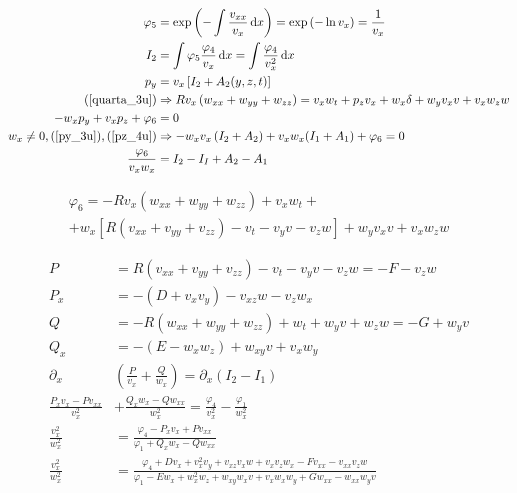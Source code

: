 \documentclass[12pt,a4paper]{article}
\begin{document}
	\begin{align}
	  \varphi_5 &= \exp \left(- \int{ \frac{v_{xx}}{v_x} \,\mathrm{d} x} \right) = \exp \left(- \ln v_x \right) = \frac{1}{v_x} \\
	  I_2 &= \int{ \varphi_5 \frac{\varphi_4 }{v_x} \,\mathrm{d} x} = \int{ \frac{\varphi_4}{v_x^2} \,\mathrm{d} x} \\
	  p_y &= v_x \left[ I_2 + A_2(y,z,t) \right] \label{py_3u} \\
    (\ref{quarta_3u}) &\Rightarrow R v_x \left(w_{xx} + w_{yy} + w_{zz} \right) = v_x w_t + p_z v_x + w_x \delta + w_y v_x v + v_x w_z w \\
    -w_x p_y + v_x p_z + \varphi_6 &= 0 \\
    w_x \neq 0, (\ref{py_3u}), (\ref{pz_4u}) &\Rightarrow - w_x v_x \left(I_2 + A_2 \right) + v_x w_x (I_1 + A_1) + \varphi_6 = 0 \\
    \frac{\varphi_6}{v_x w_x} &= I_2 - I_I + A_2 - A_1
	\end{align}

	\begin{multline}
	  \varphi_6 = - R v_x \left(w_{xx} + w_{yy} + w_{zz} \right) + v_x w_t + \\
	  + w_x \left[ R \left(v_{xx} + v_{yy} + v_{zz} \right) - v_t - v_y v - v_z w \right] + w_y v_x v + v_x w_z w
	\end{multline}

	\begin{align}
	  P &= R \left(v_{xx} + v_{yy} + v_{zz} \right) - v_t - v_y v - v_z w = - F - v_z w \\
	  P_x &= -\left( D + v_x v_y \right) - v_{xz} w - v_z w_x \\
	  Q &= -R \left(w_{xx} + w_{yy} + w_{zz} \right) + w_t + w_y v + w_z w = - G + w_y v \\
	  Q_x &= -\left( E - w_x w_z \right) + w_{xy} v + v_x w_y \\
	  \partial_x &\left( \frac{P}{v_x} + \frac{Q}{w_x} \right) = \partial_x \left(I_2 - I_1 \right) \\
	  \frac{P_x v_x - P v_{xx}}{v_x^2} &+ \frac{Q_x w_x - Q w_{xx}}{w_x^2} = \frac{\varphi_4}{v_x^2} - \frac{\varphi_1}{w_x^2} \\
	  \frac{v_x^2}{w_x^2} &= \frac{\varphi_4 - P_x v_x + P v_{xx}}{\varphi_1 + Q_x w_x - Q w_{xx}} \\
	  \frac{v_x^2}{w_x^2} &= \frac{\varphi_4 + Dv_x + v_x^2 v_y + v_{xz} v_x w + v_x v_z w_x - F v_{xx} - v_{xx} v_z w}{\varphi_1 - E w_x + w_x^2 w_z + w_{xy} w_x v + v_x w_x w_y + G w_{xx} - w_{xx} w_y v}
	\end{align}
\end{document}
